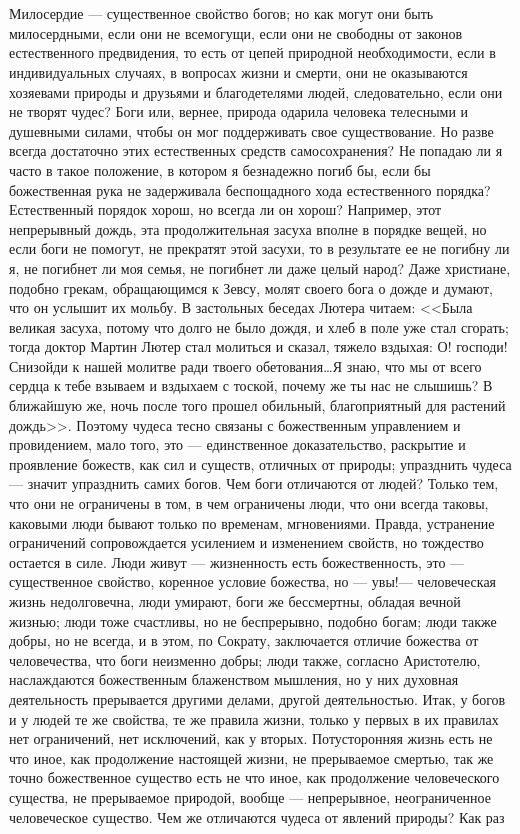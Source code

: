 \documentclass[12pt]{article}
\begin{document}
\section{}

Милосердие --- существенное свойство богов; но как могут они быть милосердными, если они не всемогущи, если они не свободны от законов естественного предвидения, то есть от цепей природной необходимости, если в индивидуальных случаях, в вопросах жизни и смерти, они не оказываются хозяевами природы и друзьями и благодетелями людей, следовательно, если они не творят чудес? Боги или, вернее, природа одарила человека телесными и душевными силами, чтобы он мог поддерживать свое существование. Но разве всегда достаточно этих естественных средств самосохранения? Не попадаю ли я часто в такое положение, в котором я безнадежно погиб бы, если бы божественная рука не задерживала беспощадного хода естественного порядка? Естественный порядок хорош, но всегда ли он хорош? Например, этот непрерывный дождь, эта продолжительная засуха вполне в порядке вещей, но если боги не помогут, не прекратят этой засухи, то в результате ее не погибну ли я, не погибнет ли моя семья, не погибнет ли даже целый народ? Даже христиане, подобно грекам, обращающимся к Зевсу, молят своего бога о дожде и думают, что он услышит их мольбу. В застольных беседах Лютера читаем: <<Была великая засуха, потому что долго не было дождя, и хлеб в поле уже стал сгорать; тогда доктор Мартин Лютер стал молиться и сказал, тяжело вздыхая: О! господи! Снизойди к нашей молитве ради твоего обетования\dots Я знаю, что мы от всего сердца к тебе взываем и вздыхаем с тоской, почему же ты нас не слышишь? В ближайшую же, ночь после того прошел обильный, благоприятный для растений дождь>>. Поэтому чудеса тесно связаны с божественным управлением и провидением, мало того, это --- единственное доказательство, раскрытие и проявление божеств, как сил и существ, отличных от природы; упразднить чудеса --- значит упразднить самих богов. Чем боги отличаются от людей? Только тем, что они не ограничены в том, в чем ограничены люди, что они всегда таковы, каковыми люди бывают только по временам, мгновениями. Правда, устранение ограничений сопровождается усилением и изменением свойств, но тождество остается в силе. Люди живут --- жизненность есть божественность, это --- существенное свойство, коренное условие божества, но --- увы!--- человеческая жизнь недолговечна, люди умирают, боги же бессмертны, обладая вечной жизнью; люди тоже счастливы, но не беспрерывно, подобно богам; люди также добры, но не всегда, и в этом, по Сократу, заключается отличие божества от человечества, что боги неизменно добры; люди также, согласно Аристотелю, наслаждаются божественным блаженством мышления, но у них духовная деятельность прерывается другими делами, другой деятельностью. Итак, у богов и у людей те же свойства, те же правила жизни, только у первых в их правилах нет ограничений, нет исключений, как у вторых. Потусторонняя жизнь есть не что иное, как продолжение настоящей жизни, не прерываемое смертью, так же точно божественное существо есть не что иное, как продолжение человеческого существа, не прерываемое природой, вообще --- непрерывное, неограниченное человеческое существо. Чем же отличаются чудеса от явлений природы? Как раз 
\end{document}
